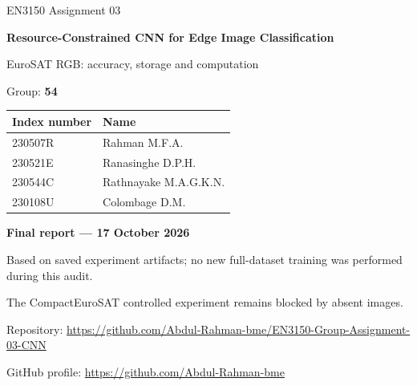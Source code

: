 \documentclass[11pt,a4paper]{article}
\begin{document}

\begin{titlepage}

\centering

{\Large EN3150 Assignment 03\par}\vspace{18mm}

{\LARGE\bfseries Resource-Constrained CNN for Edge Image Classification\par}

\vspace{10mm}

{\large EuroSAT RGB: accuracy, storage and computation\par}\vspace{12mm}

{\large Group: \textbf{54}\par}

\vspace{10mm}

\begin{tabular}{ll}\toprule Index number & Name\\\midrule

230507R & Rahman M.F.A.\\

230521E & Ranasinghe D.P.H.\\

230544C & Rathnayake M.A.G.K.N.\\

230108U & Colombage D.M.\\\bottomrule\end{tabular}

\vspace{10mm}

\vfill

\textbf{Final report --- 17 October 2026}\par

Based on saved experiment artifacts; no new full-dataset training was performed during this audit.

The CompactEuroSAT controlled experiment remains blocked by absent images.

\vspace{8mm}

\par Repository: \url{https://github.com/Abdul-Rahman-bme/EN3150-Group-Assignment-03-CNN}

\par GitHub profile: \url{https://github.com/Abdul-Rahman-bme}

\end{titlepage}
\end{document}
